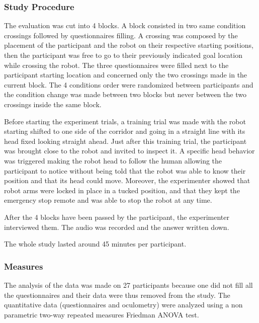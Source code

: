 \documentclass[a4paper,11pt,twoside]{StyleThese}
\begin{document}
\subsubsection{Study Procedure}
The evaluation was cut into 4 blocks. A block consisted in two same condition crossings followed by questionnaires filling. A crossing was composed by the placement of the participant and the robot on their respective starting positions, then the participant was free to go to their previously indicated goal location while crossing the robot. The three questionnaires were filled next to the participant starting location and concerned only the two crossings made in the current block. The 4 conditions order were randomized between participants and the condition change was made between two blocks but never between the two crossings inside the same block.

Before starting the experiment trials, a training trial was made with the robot starting shifted to one side of the corridor and going in a straight line with its head fixed looking straight ahead. Just after this training trial, the participant was brought close to the robot and invited to inspect it. A specific head behavior was triggered making the robot head to follow the human allowing the participant to notice without being told that the robot was able to know their position and that its head could move. Moreover, the experimenter showed that robot arms were locked in place in a tucked position, and that they kept the emergency stop remote and was able to stop the robot at any time.

After the 4 blocks have been passed by the participant, the experimenter interviewed them. The audio was recorded and the answer written down.

The whole study lasted around 45 minutes per participant.

\subsubsection{Measures}
The analysis of the data was made on 27 participants because one did not fill all the questionnaires and their data were thus removed from the study. The quantitative data (questionnaires and oculometry) were analyzed using a non parametric two-way repeated measures Friedman ANOVA test.
\end{document}
